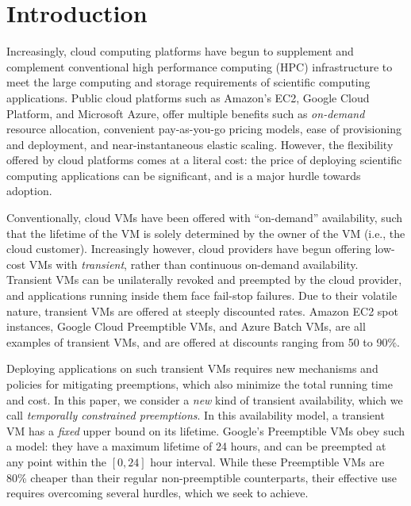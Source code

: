 \documentclass[compsoc]{IEEEtran}
\begin{document}
\section{Introduction}
\label{sec:intro}

Increasingly, cloud computing platforms have begun to supplement and complement conventional high performance computing (HPC) infrastructure to meet the large computing and storage requirements of scientific computing applications. Public cloud platforms such as Amazon's EC2, Google Cloud Platform, and Microsoft Azure, offer multiple benefits such as \emph{on-demand} resource allocation, convenient pay-as-you-go pricing models, ease of provisioning and deployment, and near-instantaneous elastic scaling. 
However, the flexibility offered by cloud platforms comes at a literal cost: the price of deploying scientific computing applications can be significant, and is a major hurdle towards adoption. 

Conventionally, cloud VMs have been offered with ``on-demand'' availability, such that the lifetime of the VM is solely determined by the owner of the VM (i.e., the cloud customer). 
Increasingly however, cloud providers have begun offering low-cost VMs with \emph{transient}, rather than continuous on-demand availability. 
Transient VMs can be unilaterally revoked and preempted by the cloud provider, and applications running inside them face fail-stop failures. 
Due to their volatile nature, transient VMs are offered at steeply discounted rates. Amazon EC2 spot instances, Google Cloud Preemptible VMs, and Azure Batch VMs, are all examples of transient VMs, and are offered at discounts ranging from 50 to 90\%.  


Deploying applications on such transient VMs requires new mechanisms and policies for mitigating preemptions, which also minimize the total running time and cost.
In this paper, we consider a \emph{new} kind of transient availability, which we call \emph{temporally constrained preemptions}.
In this availability model, a transient VM has a \emph{fixed} upper bound on its lifetime.
Google's Preemptible VMs obey such a model: they have a maximum lifetime of 24 hours, and can be preempted at any point within the $[0, 24]$ hour interval.
While these Preemptible VMs are 80\% cheaper than their regular non-preemptible counterparts, their effective use requires overcoming several hurdles, which we seek to achieve.
\end{document}
